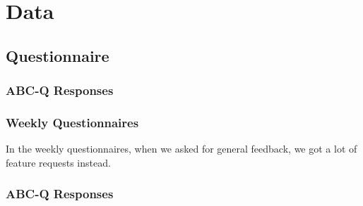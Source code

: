 \chapter{Data}
\section{Questionnaire}

\subsection{ABC-Q Responses}
  \begin{table}
  \end{table}

\subsection{Weekly Questionnaires}
  In the weekly questionnaires, when we asked for general feedback,
  we got a lot of feature requests instead.

  \begin{enumerate}
  
  \end{enumerate}

\subsection{ABC-Q Responses}
  \begin{table}
  \end{table}

